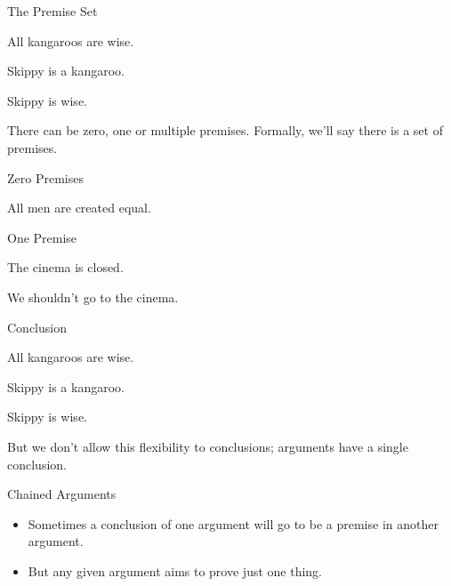 \documentclass[
  ignorenonframetext,
]{beamer}
\providecommand{\tightlist}{%
  \setlength{\itemsep}{0pt}\setlength{\parskip}{0pt}}
\renewcommand{\,}{\text{, }}
\renewenvironment*{quote}	
	{\list{}{\rightmargin   \leftmargin} \item } 	
	{\endlist }
\newcommand{\DisplayArg}[2]{
\begin{enumerate}
{#1}
\end{enumerate}
\vspace{-6pt}
\hrulefill

\begin{quote}
{\normalfont #2}
\end{quote}
\vspace{12pt}
}
\begin{document}
\begin{frame}{The Premise Set}
\protect\hypertarget{the-premise-set}{}

\DisplayArg{ \item All kangaroos are wise. \item Skippy is a kangaroo. } { Skippy is wise. }

There can be zero, one or multiple premises. Formally, we'll say there
is a set of premises.

\end{frame}

\begin{frame}{Zero Premises}
\protect\hypertarget{zero-premises}{}

\hrulefill \begin{quote} {\normalfont All men are created equal.} \end{quote} \vspace{12pt}

\end{frame}

\begin{frame}{One Premise}
\protect\hypertarget{one-premise}{}

\DisplayArg{ \item The cinema is closed. } { We shouldn't go to the cinema. }

\end{frame}

\begin{frame}{Conclusion}
\protect\hypertarget{conclusion-1}{}

\DisplayArg{ \item All kangaroos are wise. \item Skippy is a kangaroo. } { Skippy is wise. }

But we don't allow this flexibility to conclusions; arguments have a
single conclusion.

\end{frame}

\begin{frame}{Chained Arguments}
\protect\hypertarget{chained-arguments}{}

\begin{itemize}
\tightlist
\item
  Sometimes a conclusion of one argument will go to be a premise in
  another argument.
\item
  But any given argument aims to prove just one thing.
\end{itemize}

\end{frame}
\end{document}
